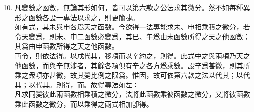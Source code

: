 \begin{enumerate} [label={第\chinese*款},nolistsep]
	\setcounter{enumi}{9}
	\item 凡變數之函數，無論其形如何，皆可以第六款之公法求其微分。然不如每種異形之函數各設一專法以求之，則更簡捷。\\
	如有式\CJKmove，其未與申各爲天之函數。今欲得一法專能求未、申相乘積之微分，若令天變爲\CJKmove，則未、申二函數必變爲\CJKmove，其巳、午爲由未函數所得之天之他函數；其\CJKmove 爲由申函數所得之天之他函數。\\
	再令\CJKmove，則依法得\CJKmove。以戌代其\CJKmove，移項而以辛約之，則得\CJKmove。此式中之\CJKmove 與\CJKmove 兩項乃天之他函數，而與辛無涉者，其餘各項俱有辛之各方爲乘數。設辛爲甚微，則其所乘之衆項亦甚微，故其變比例之限爲\CJKmove。惟因\CJKmove，故可依第六款之法以\CJKmove 代其\CJKmove；以\CJKmove 代其\CJKmove；以\CJKmove 代其\CJKmove。則得\CJKmove，而\CJKmove。故得專法如左：\\
	凡求同變彼此兩函數相乘積之微分，法將此函數乘彼函數之微分，又將彼函數乘此函數之微分，而以乘得之兩式相加卽得。
\end{enumerate}

